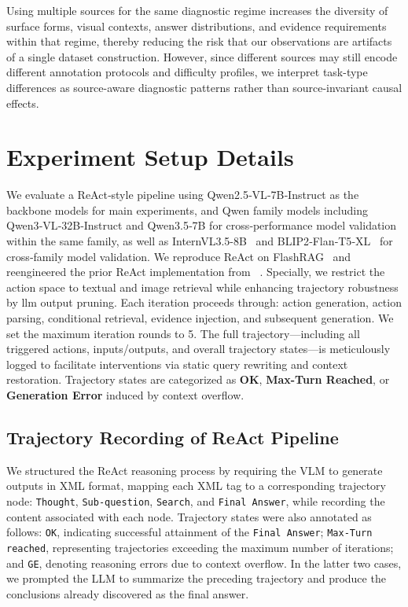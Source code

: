 \documentclass{article} %
\begin{document}
Using multiple sources for the same diagnostic regime increases the diversity of surface forms, visual contexts, answer distributions, and evidence requirements within that regime, thereby reducing the risk that our observations are artifacts of a single dataset construction. However, since different sources may still encode different annotation protocols and difficulty profiles, we interpret task-type differences as source-aware diagnostic patterns rather than source-invariant causal effects.

\section{Experiment Setup Details}\label{app:experiment_setup_details}
We evaluate a ReAct‑style pipeline using Qwen2.5‑VL‑7B‑Instruct as the backbone models for main experiments, and Qwen family models including Qwen3‑VL‑32B‑Instruct and Qwen3.5‑7B for cross‑performance model validation within the same family, as well as InternVL3.5-8B~\citep{wang2025internvl3_5} and BLIP2‑Flan‑T5‑XL~\citep{li2023blip,chung2024scaling} for cross‑family model validation. We reproduce ReAct on FlashRAG~\citep{jin2025flashrag} and reengineered the prior ReAct implementation from ~\citep{li2024benchmarking}. Specially, we restrict the action space to textual and image retrieval while enhancing trajectory robustness by llm output pruning. Each iteration proceeds through: action generation, action parsing, conditional retrieval, evidence injection, and subsequent generation. We set the maximum iteration rounds to 5. The full trajectory—including all triggered actions, inputs/outputs, and overall trajectory states—is meticulously logged to facilitate interventions via static query rewriting and context restoration. Trajectory states are categorized as \textbf{OK}, \textbf{Max-Turn Reached}, or \textbf{Generation Error} induced by context overflow.

\subsection{Trajectory Recording of ReAct Pipeline}
We structured the ReAct reasoning process by requiring the VLM to generate outputs in XML format, mapping each XML tag to a corresponding trajectory node: \texttt{Thought}, \texttt{Sub-question}, \texttt{Search}, and \texttt{Final Answer}, while recording the content associated with each node. Trajectory states were also annotated as follows: \texttt{OK}, indicating successful attainment of the \texttt{Final Answer}; \texttt{Max-Turn reached}, representing trajectories exceeding the maximum number of iterations; and \texttt{GE}, denoting reasoning errors due to context overflow. In the latter two cases, we prompted the LLM to summarize the preceding trajectory and produce the conclusions already discovered as the final answer.
\end{document}
